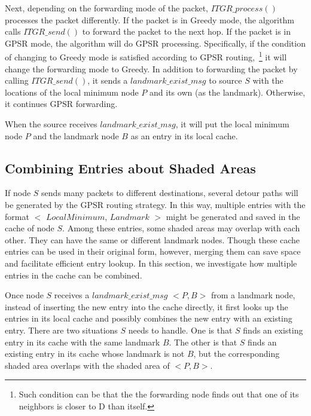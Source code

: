 \documentclass[3p,times]{elsarticle}
\begin{document}
Next, depending on the forwarding mode of the packet, $ITGR\_process()$
processes the packet differently.
If the packet is in Greedy mode, the algorithm calls $ITGR\_send()$
to forward the packet to the next hop.
If the packet is in GPSR mode, the algorithm will do GPSR processing.
Specifically, if the condition of changing to Greedy mode is satisfied according to
GPSR routing,~\footnote{Such condition can be that the the forwarding
node finds out that one of its neighbors is closer to D than itself.}
it will change the forwarding mode to Greedy.
In addition to forwarding the packet by calling $ITGR\_send()$, it sends a
$landmark\_exist\_msg$ to source $S$ with the locations of the local minimum
node $P$ and its own (as the landmark).
Otherwise, it continues GPSR forwarding.





When the source receives
$landmark\_exist\_msg$,
it will put the local minimum node $P$ and the landmark node $B$ as an entry in its local cache.



\subsection{Combining Entries about Shaded Areas}
\label{merge}


If node $S$ sends many packets to different destinations, several detour paths will be generated by the GPSR routing strategy.
In this way, multiple entries with the format $<$ $LocalMinimum$, $Landmark$ $>$ might be
generated and saved in the cache of node $S$.
Among these entries, some shaded areas may overlap with each other. They
can have the same or different landmark nodes.
Though these cache entries can be used in their original form,
however, merging them can save space and facilitate efficient entry lookup.
In this section, we investigate how multiple entries in the cache can be combined.

Once node $S$ receives a $landmark\_exist\_msg$
$<P, B>$ from a landmark node, instead of inserting the new entry into the cache
directly, it first
looks up the entries in its local cache and possibly combines the new entry with an existing entry.
There are two situations $S$ needs to handle. One is that $S$ finds an existing entry in its cache with the same landmark $B$.
The other is that
$S$ finds an existing entry in its cache whose landmark is not $B$,
but the corresponding shaded area overlaps with the shaded area of $<P, B>$.
\end{document}
